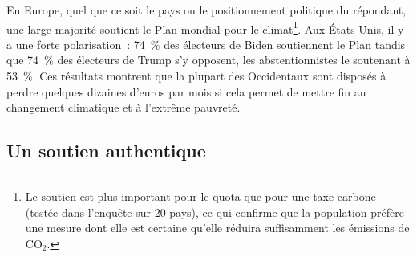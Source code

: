 \documentclass[a5paper,french]{memoir}
\begin{document}
En Europe, quel que ce soit le pays ou le positionnement politique du répondant, une large majorité soutient le Plan mondial pour le climat\footnote{Le soutien est plus important pour le quota que pour une taxe carbone (testée dans l'enquête sur 20 pays), ce qui confirme que la population préfère une mesure dont elle est certaine qu'elle réduira suffisamment les émissions de CO$_\text{2}$.}. 
Aux États-Unis, il y a une forte polarisation~: 74~\% des électeurs de Biden soutiennent le Plan tandis que 74~\% des électeurs de Trump s'y opposent, les abstentionnistes le soutenant à 53~\%.  
Ces résultats montrent que la plupart des Occidentaux sont disposés à perdre quelques dizaines d'euros par mois si cela permet de mettre fin au changement climatique et à l'extrême pauvreté. 

\subsection{Un soutien authentique} %
\end{document}
